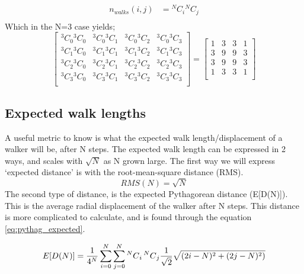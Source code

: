 	\begin{align}
		n_{walks}(i,j) &= {}^NC_i {}^NC_j \\ 
		\label{eq:possiblewalks}
	\end{align}
	Which in the N=3 case yields;
\[
	\begin{bmatrix}
	{}^3C_0 {}^3C_0   &	{}^3C_0 {}^3C_1   &	{}^3C_0 {}^3C_2   &	{}^3C_0 {}^3C_3   \\
	{}^3C_1 {}^3C_0   &	{}^3C_1 {}^3C_1   &	{}^3C_1 {}^3C_2   &	{}^3C_1 {}^3C_3   \\
	{}^3C_2 {}^3C_0   &	{}^3C_2 {}^3C_1   &	{}^3C_2 {}^3C_2   &	{}^3C_2 {}^3C_3   \\	
	{}^3C_3 {}^3C_0   &	{}^3C_3 {}^3C_1   &	{}^3C_3 {}^3C_2   &	{}^3C_3 {}^3C_3   \\
	\end{bmatrix} 
 = 
	\begin{bmatrix}
	1 & 3 & 3 & 1 \\ 
	3 & 9 & 9 & 3 \\ 
	3 & 9 & 9 & 3 \\ 
	1 & 3 & 3 & 1 \\ 
	\end{bmatrix} 
\]	
	
 	\subsection{Expected walk lengths}
 	A useful metric to know is what the expected walk length/displacement of a walker will be, after N steps. The expected walk length can be expressed in 2 ways, and scales with $\sqrt{N}$ as N grown large. The first way we will express `expected distance' is with the root-mean-square distance (RMS). 
 	\begin{equation}
 	RMS(N) = \sqrt{N}
 	 \end{equation}
 	The second type of distance, is the expected Pythagorean distance (E[D(N)]). This is the average radial displacement of the walker after N steps. This distance is more complicated to calculate, and is found through the equation \ref{eq:pythag_expected}.
 	
 	\begin{equation}
 	E[D(N)] = \frac{1}{4^N}\sum_{i=0}^{N}\sum_{j=0}^{N}\prescript{N}{}{C}_{i}\prescript{N}{}{C}_{j} \frac{1}{\sqrt{2}}\sqrt{(2i-N)^2+(2j-N)^2)} 
 	\label{eq:pythag_expected}
 	\end{equation}
 	
